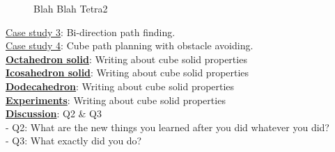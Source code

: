 \begin{center}
\begin{figure}[h]
\hfill
{}
\caption{Blah Blah Tetra2}
\end{figure}
\end{center}

\noindent\uline{Case study 3}: Bi-direction path finding.\\

\noindent\uline{Case study 4}: Cube path planning with obstacle avoiding.\\

\noindent\uline{\textbf{Octahedron solid}}:
Writing about cube solid properties\\

\noindent\uline{\textbf{Icosahedron solid}}:
Writing about cube solid properties\\

\noindent\uline{\textbf{Dodecahedron}}:
Writing about cube solid properties\\


\noindent\uline{\textbf{Experiments}}:
Writing about cube solid properties\\

\noindent\uline{\textbf{Discussion}}: Q2 \& Q3\\
- Q2: What are the new things you learned after you did whatever you did?\\
- Q3: What exactly did you do?